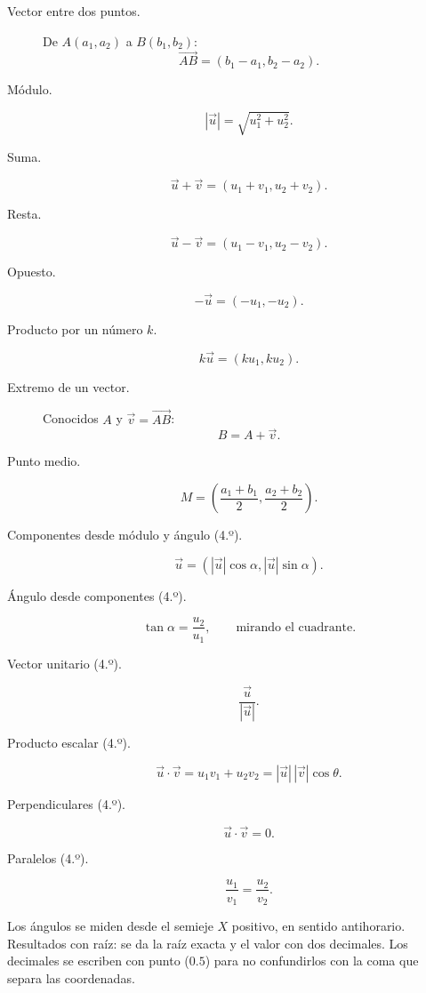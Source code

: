 \begin{description}
    \item[Vector entre dos puntos.]
    De $A(a_1,a_2)$ a $B(b_1,b_2)$:
    \[
    \overrightarrow{AB}=(b_1-a_1,b_2-a_2).
    \]

    \item[Módulo.]
    \[
    |\vec{u}|=\sqrt{u_1^2+u_2^2}.
    \]

    \item[Suma.]
    \[
    \vec{u}+\vec{v}=(u_1+v_1,u_2+v_2).
    \]

    \item[Resta.]
    \[
    \vec{u}-\vec{v}=(u_1-v_1,u_2-v_2).
    \]

    \item[Opuesto.]
    \[
    -\vec{u}=(-u_1,-u_2).
    \]

    \item[Producto por un número $k$.]
    \[
    k\vec{u}=(ku_1,ku_2).
    \]

    \item[Extremo de un vector.]
    Conocidos $A$ y $\vec{v}=\overrightarrow{AB}$:
    \[
    B=A+\vec{v}.
    \]

    \item[Punto medio.]
    \[
    M=\left(\frac{a_1+b_1}{2},\frac{a_2+b_2}{2}\right).
    \]

    \item[Componentes desde módulo y ángulo (4.º).]
    \[
    \vec{u}=(|\vec{u}|\cos\alpha,|\vec{u}|\sin\alpha).
    \]

    \item[Ángulo desde componentes (4.º).]
    \[
    \tan\alpha=\frac{u_2}{u_1},
    \qquad \text{mirando el cuadrante}.
    \]

    \item[Vector unitario (4.º).]
    \[
    \frac{\vec{u}}{|\vec{u}|}.
    \]

    \item[Producto escalar (4.º).]
    \[
    \vec{u}\cdot\vec{v}
    =u_1v_1+u_2v_2
    =|\vec{u}|\,|\vec{v}|\cos\theta.
    \]

    \item[Perpendiculares (4.º).]
    \[
    \vec{u}\cdot\vec{v}=0.
    \]

    \item[Paralelos (4.º).]
    \[
    \frac{u_1}{v_1}=\frac{u_2}{v_2}.
    \]
\end{description}

Los ángulos se miden desde el semieje $X$ positivo, en sentido antihorario. Resultados con raíz: se da la raíz exacta y el valor con dos decimales. Los decimales se escriben con punto ($0.5$) para no confundirlos con la coma que separa las coordenadas.

